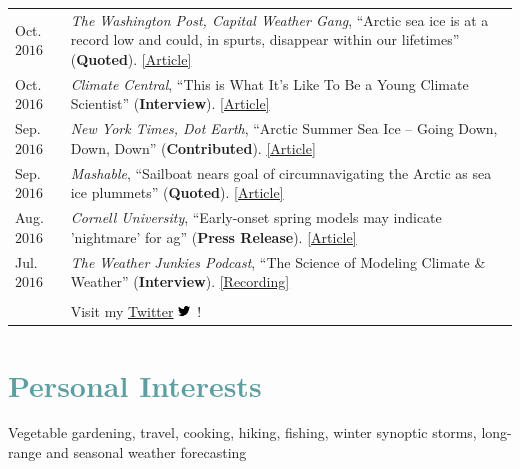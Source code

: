 \documentclass[margin,line,palatino,courier,10pt]{res}
\begin{document}
\begin{resume}
\begin{tabular}{@{}p{0.8in}p{4in}}
Oct. $2016$ & \textit{The Washington Post, Capital Weather Gang}, ``Arctic sea ice is at a record low and could, in spurts, disappear within our lifetimes'' (\textbf{Quoted}). \href{https://www.washingtonpost.com/news/capital-weather-gang/wp/2016/10/27/arctic-sea-ice-is-at-a-record-low-and-could-in-spurts-disappear-within-our-lifetimes/}{[Article]}\\
Oct. $2016$ & \textit{Climate Central}, ``This is What It's Like To Be a Young Climate Scientist'' (\textbf{Interview}). \href{http://www.climatecentral.org/news/young-climate-scientists-interviews-20799}{[Article]}\\
Sep. $2016$ & \textit{New York Times, Dot Earth}, ``Arctic Summer Sea Ice -- Going Down, Down, Down'' (\textbf{Contributed}). \href{http://dotearth.blogs.nytimes.com/2016/09/16/arctic-summer-sea-ice-going-down-down-down/?module=BlogPost-ReadMore&version=Blog\%20Main&action=Click&contentCollection=arctic&pgtype=Blogs&region=Body&_r=1#more-58318}{[Article]}\\
Sep. $2016$ & \textit{Mashable}, ``Sailboat nears goal of circumnavigating the Arctic as sea ice plummets'' (\textbf{Quoted}). \href{http://mashable.com/2016/09/01/sailboat-arctic-ice-melt-open-water/#s7nzft8m6sqB}{[Article]}\\
Aug. $2016$ & \textit{Cornell University}, ``Early-onset spring models may indicate 'nightmare' for ag'' (\textbf{Press Release}). \href{http://www.news.cornell.edu/stories/2016/08/early-onset-spring-models-may-indicate-nightmare-ag}{[Article]}\\
Jul. $2016$ & \textit{The Weather Junkies Podcast}, ``The Science of Modeling Climate \& Weather'' (\textbf{Interview}). \href{https://www.youtube.com/watch?v=vgT5P9zC91U}{[Recording]}\\\\

& Visit my \href{https://twitter.com/ZLabe}{Twitter} \includegraphics[height=9pt]{twitter.png}\ !\\
\end{tabular}


\vspace{-0.1in}
\noindent\makebox[\linewidth][r]{\rule{\textwidth}{5pt}}
\vspace{-0.3in}
\newpage
\section{\sc \textcolor{CadetBlue}{\large{Personal Interests}}}
Vegetable gardening, travel, cooking, hiking, fishing, winter synoptic storms, long-range and seasonal weather forecasting

\end{resume}
\end{document}
